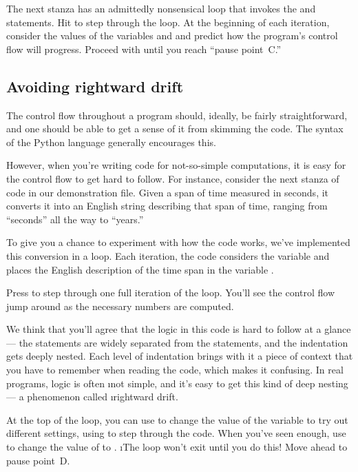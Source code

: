 \documentclass[letterpaper, 12pt, titlepage, twoside]{article}
\begin{document}
The next stanza has an admittedly nonsensical  loop that invokes the
 and  statements. \typeit Hit  to step through the
loop. At the beginning of each iteration, consider the values of the variables
 and  and predict how the program's control flow will progress.
\typeit Proceed with  until you reach ``pause point~C.''

\subsection*{Avoiding rightward drift}

The control flow throughout a program should, ideally, be fairly
straightforward, and one should be able to get a sense of it from skimming the
code. The syntax of the Python language generally encourages this.

However, when you're writing code for not-so-simple computations, it is easy
for the control flow to get hard to follow. For instance, consider the next
stanza of code in our demonstration file. Given a span of time measured in
seconds, it converts it into an English string describing that span of time,
ranging from ``seconds'' all the way to ``years.''

To give you a chance to experiment with how the code works, we've implemented
this conversion in a loop. Each iteration, the code considers the variable
 and places the English description of the time span in the
variable .

\typeit Press  to step through one full iteration of the loop. You'll see
the control flow jump around as the necessary numbers are computed.

We think that you'll agree that the logic in this code is hard to follow at a
glance --- the  statements are widely separated from the 
statements, and the indentation gets deeply nested. Each level of indentation
brings with it a piece of context that you have to remember when reading the
code, which makes it confusing. In real programs, logic is often \i{not}
simple, and it's easy to get this kind of deep nesting --- a phenomenon called
\i{rightward drift}.

\typeit At the top of the loop, you can use  to change the value
of the  variable to try out different settings, using  to step
through the code. When you've seen enough, use  to change the
value of  to . \i{The loop won't exit until you do
  this!} Move ahead to pause point~D.
\end{document}
